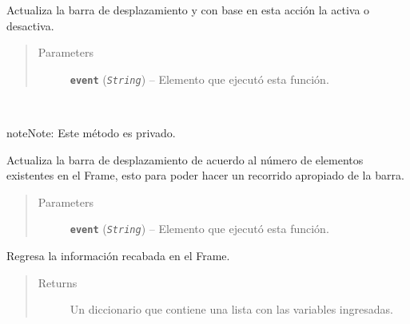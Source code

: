 \documentclass[letterpaper,10pt,english]{sphinxmanual}
\begin{document}
\begin{fulllineitems}
\begin{fulllineitems}
Actualiza la barra de desplazamiento y con base en esta acción
la activa o desactiva.
\begin{quote}\begin{description}
\item[{Parameters}] \leavevmode
\textbf{\texttt{event}} (\emph{\texttt{String}}) -- Elemento que ejecutó esta función.

\end{description}\end{quote}

\end{fulllineitems}


\begin{fulllineitems}
\label{View/Main/DecisionVariable/DecisionVariableFrame:View.Main.DecisionVariable.DecisionVariableFrame.DecisionVariableFrame._DecisionVariableFrame__update_scrollbar}~
\begin{notice}{note}{Note:}
Este método es privado.
\end{notice}

Actualiza la barra de desplazamiento de acuerdo al número de elementos
existentes en el Frame, esto para poder hacer un recorrido apropiado de 
la barra.
\begin{quote}\begin{description}
\item[{Parameters}] \leavevmode
\textbf{\texttt{event}} (\emph{\texttt{String}}) -- Elemento que ejecutó esta función.

\end{description}\end{quote}

\end{fulllineitems}


\begin{fulllineitems}
\label{View/Main/DecisionVariable/DecisionVariableFrame:View.Main.DecisionVariable.DecisionVariableFrame.DecisionVariableFrame.get_information}
Regresa la información recabada en el Frame.
\begin{quote}\begin{description}
\item[{Returns}] \leavevmode
Un diccionario que contiene una lista con las variables ingresadas.


\end{description}
\end{quote}
\end{fulllineitems}
\end{fulllineitems}
\end{document}
